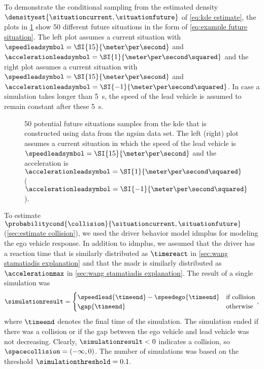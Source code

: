 To demonstrate the conditional sampling from the estimated density $\densityest{\situationcurrent,\situationfuture}$ of \cref{eq:kde estimate}, the plots in \cref{fig:speed profiles} show 50 different future situations in the form of \cref{eq:example future situation}.
The left plot assumes a current situation with $\speedleadsymbol=\SI{15}{\meter\per\second}$ and $\accelerationleadsymbol=\SI{1}{\meter\per\second\squared}$ and the right plot assumes a current situation with $\speedleadsymbol=\SI{15}{\meter\per\second}$ and $\accelerationleadsymbol=\SI{-1}{\meter\per\second\squared}$.
In case a simulation takes longer than \SI{5}{\second}, the speed of the lead vehicle is assumed to remain constant after these \SI{5}{\second}.

\setlength{\figurewidth}{.49\linewidth}
\setlength{\figureheight}{.7\figurewidth}
\begin{figure}
	\centering
	
	
	\caption{50 potential future situations samples from the \ac{kde} that is constructed using data from the \ac{ngsim} data set. 
		The left (right) plot assumes a current situation in which the speed of the lead vehicle is $\speedleadsymbol=\SI{15}{\meter\per\second}$ and the acceleration is $\accelerationleadsymbol=\SI{1}{\meter\per\second\squared}$ ($\accelerationleadsymbol=\SI{-1}{\meter\per\second\squared}$).}
	\label{fig:speed profiles}
\end{figure}

To estimate $\probabilitycond{\collision}{\situationcurrent, \situationfuture}$ (\cref{sec:estimate collision}), we used the driver behavior model \ac{idmplus} \autocite{schakel2010effects} for modeling the ego vehicle response.
In addition to \ac{idmplus}, we assumed that the driver has a reaction time that is similarly distributed as $\timereact$ in \cref{sec:wang stamatiadis explanation} and that the \ac{madr} is similarly distributed as $\accelerationmax$ in \cref{sec:wang stamatiadis explanation}.
The result of a single simulation was
\begin{equation}
	\simulationresult = \begin{cases}
		\speedlead{\timeend} - \speedego{\timeend} & \text{if collision} \\
		\gap{\timeend} & \text{otherwise}
	\end{cases},
\end{equation}
where $\timeend$ denotes the final time of the simulation.
The simulation ended if there was a collision or if the gap between the ego vehicle and lead vehicle was not decreasing.
Clearly, $\simulationresult<0$ indicates a collision, so $\spacecollision=(-\infty, 0)$.
The number of simulations was based on the threshold $\simulationthreshold=0.1$.

